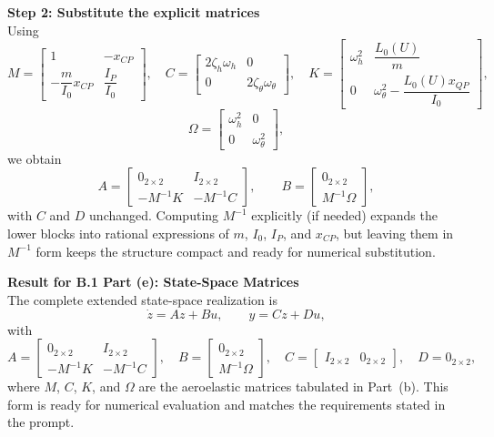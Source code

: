 \documentclass[12pt]{article}
\begin{document}
\begin{stepbox}
\textbf{Step 2: Substitute the explicit matrices}\\[0.5em]
Using
\[
M = \begin{bmatrix}
1 & -x_{CP} \\
-\dfrac{m}{I_0}x_{CP} & \dfrac{I_P}{I_0}
\end{bmatrix},
\quad
C = \begin{bmatrix}
2\zeta_h\omega_h & 0 \\
0 & 2\zeta_\theta\omega_\theta
\end{bmatrix},
\quad
K = \begin{bmatrix}
\omega_h^2 & \dfrac{L_0(U)}{m} \\
0 & \omega_\theta^2 - \dfrac{L_0(U)x_{QP}}{I_0}
\end{bmatrix},
\]
\[
\Omega = \begin{bmatrix}
\omega_h^2 & 0 \\
0 & \omega_\theta^2
\end{bmatrix},
\]
we obtain
\[
A = \begin{bmatrix}
0_{2\times2} & I_{2\times2} \\
-M^{-1}K & -M^{-1}C
\end{bmatrix}, \qquad
B = \begin{bmatrix}
0_{2\times2} \\
M^{-1}\Omega
\end{bmatrix},
\]
with $C$ and $D$ unchanged.  Computing $M^{-1}$ explicitly (if needed) expands the lower blocks into rational expressions of $m$, $I_0$, $I_P$, and $x_{CP}$, but leaving them in $M^{-1}$ form keeps the structure compact and ready for numerical substitution.
\end{stepbox}

\begin{resultsbox}
\textbf{Result for B.1 Part (e): State-Space Matrices}\\[0.5em]
The complete extended state-space realization is
\[
\dot{z} = A z + B u, \qquad y = C z + D u,
\]
with
\[
A = \begin{bmatrix}
0_{2\times2} & I_{2\times2} \\
-M^{-1}K & -M^{-1}C
\end{bmatrix}, \quad
B = \begin{bmatrix}
0_{2\times2} \\
M^{-1}\Omega
\end{bmatrix}, \quad
C = \begin{bmatrix}
I_{2\times2} & 0_{2\times2}
\end{bmatrix}, \quad
D = 0_{2\times2},
\]
where $M$, $C$, $K$, and $\Omega$ are the aeroelastic matrices tabulated in Part~(b).  This form is ready for numerical evaluation and matches the requirements stated in the prompt.
\end{resultsbox}
\end{document}
